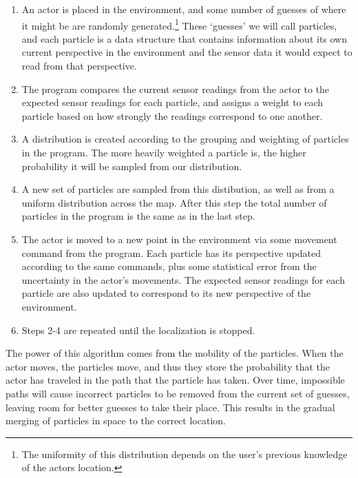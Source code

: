 \documentclass[a4paper,11pt]{article}
\begin{document}
  \begin{enumerate}
  \item An actor is placed in the environment, and some number of guesses of where it might be are randomly generated.\footnote{The uniformity of this distribution depends on the user's previous knowledge of the actors location.} These `guesses' we will call particles, and each particle is a data structure that contains information about its own current perspective in the environment and the sensor data it would expect to read from that perspective.
  \item The program compares the current sensor readings from the actor to the expected sensor readings for each particle, and assigns a weight to each particle based on how strongly the readings correspond to one another.
  \item A distribution is created according to the grouping and weighting of particles in the program. The more heavily weighted a particle is, the higher probability it will be sampled from our distribution.
  \item A new set of particles are sampled from this distibution, as well as from a uniform distribution across the map. After this step the total number of particles in the program is the same as in the last step.
  \item The actor is moved to a new point in the environment via some movement command from the program. Each particle has its perspective updated according to the same commands, plus some statistical error from the uncertainty in the actor's movements. The expected sensor readings for each particle are also updated to correspond to its new perspective of the environment.
  \item Steps 2-4 are repeated until the localization is stopped. 
  \end{enumerate} 
  
The power of this algorithm comes from the mobility of the particles. When the actor moves, the particles move, and thus they store the probability that the actor has traveled in the path that the particle has taken. Over time, impossible paths will cause incorrect particles to be removed from the current set of guesses, leaving room for better guesses to take their place. This results in the gradual merging of particles in space to the correct location.

\end{document}
